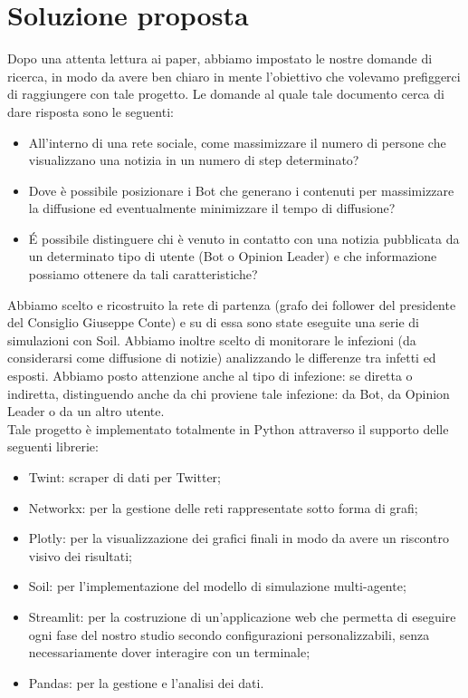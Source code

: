 \section{Soluzione proposta}
Dopo una attenta lettura ai paper, abbiamo impostato le nostre domande di ricerca, in modo da avere ben chiaro in mente l'obiettivo che volevamo prefiggerci di raggiungere con tale progetto. Le domande al quale tale documento cerca di dare risposta sono le seguenti:
\begin{itemize}
  \item All'interno di una rete sociale, come massimizzare il numero di persone che visualizzano una notizia in un numero di step determinato?
  \item Dove è possibile posizionare i Bot che generano i contenuti per massimizzare la diffusione ed eventualmente minimizzare il tempo di diffusione?
  \item \'E possibile distinguere chi è venuto in contatto con una notizia pubblicata da un determinato tipo di utente (Bot o Opinion Leader) e che informazione possiamo ottenere da tali caratteristiche?
\end{itemize}
Abbiamo scelto e ricostruito la rete di partenza (grafo dei follower del presidente del Consiglio Giuseppe Conte) e su di essa sono state eseguite una serie di simulazioni con Soil. Abbiamo inoltre scelto di monitorare le infezioni (da considerarsi come diffusione di notizie) analizzando le differenze tra infetti ed esposti. Abbiamo posto attenzione anche al tipo di infezione: se diretta o indiretta, distinguendo anche da chi proviene tale infezione: da Bot, da Opinion Leader o da un altro utente.
\\
Tale progetto è implementato totalmente in Python attraverso il supporto delle seguenti librerie:
\begin{itemize}
    \item Twint: scraper di dati per Twitter;
    \item Networkx: per la gestione delle reti rappresentate sotto forma di grafi;
    \item Plotly: per la visualizzazione dei grafici finali in modo da avere un riscontro visivo dei risultati;
    \item Soil: per l'implementazione del modello di simulazione multi-agente;
    \item Streamlit: per la costruzione di un'applicazione web che permetta di eseguire ogni fase del nostro studio secondo configurazioni personalizzabili, senza necessariamente dover interagire con un terminale;
    \item Pandas: per la gestione e l'analisi dei dati.
\end{itemize}

